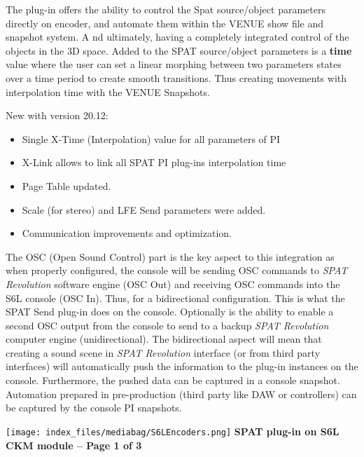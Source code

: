 \documentclass[
  letterpaper,
  DIV=11,
  numbers=noendperiod]{scrreport}
\providecommand{\tightlist}{%
  \setlength{\itemsep}{0pt}\setlength{\parskip}{0pt}}\usepackage{longtable,booktabs,array}
\begin{document}
The plug-in offers the ability to control the Spat source/object
parameters directly on encoder, and automate them within the VENUE show
file and snapshot system. A nd ultimately, having a completely
integrated control of the objects in the 3D space. Added to the SPAT
source/object parameters is a \textbf{time} value where the user can set
a linear morphing between two parameters states over a time period to
create smooth transitions. Thus creating movements with interpolation
time with the VENUE Snapshots.

New with version 20.12:

\begin{itemize}
\tightlist
\item
  Single X-Time (Interpolation) value for all parameters of PI
\item
  X-Link allows to link all SPAT PI plug-ins interpolation time
\item
  Page Table updated.
\item
  Scale (for stereo) and LFE Send parameters were added.
\item
  Communication improvements and optimization.
\end{itemize}

The OSC (Open Sound Control) part is the key aspect to this integration
as when properly configured, the console will be sending OSC commands to
\emph{SPAT Revolution} software engine (OSC Out) and receiving OSC
commands into the S6L console (OSC In). Thus, for a bidirectional
configuration. This is what the SPAT Send plug-in does on the console.
Optionally is the ability to enable a second OSC output from the console
to send to a backup \emph{SPAT Revolution} computer engine
(unidirectional). The bidirectional aspect will mean that creating a
sound scene in \emph{SPAT Revolution} interface (or from third party
interfaces) will automatically push the information to the plug-in
instances on the console. Furthermore, the pushed data can be captured
in a console snapshot. Automation prepared in pre-production (third
party like DAW or controllers) can be captured by the console PI
snapshots.

\texttt{[image: index\_files/mediabag/S6LEncoders.png]} \textbf{SPAT
plug-in on S6L CKM module -- Page 1 of 3}
\end{document}
